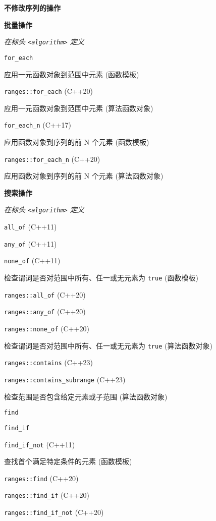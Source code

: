 \textbf{不修改序列的操作}

\noindent \textbf{批量操作} 

\textit{在标头 \lstinline{<algorithm>} 定义}

\noindent \lstinline{for_each}

应⽤⼀元函数对象到范围中元素 (函数模板)

\noindent \lstinline{ranges::for_each} (C++20) 

应⽤⼀元函数对象到范围中元素 (算法函数对象)

\noindent \lstinline{for_each_n} (C++17) 

应⽤函数对象到序列的前 N 个元素 (函数模板)

\noindent \lstinline{ranges::for_each_n} (C++20) 

应⽤函数对象到序列的前 N 个元素 (算法函数对象)

\noindent \textbf{搜索操作} 

\textit{在标头 \lstinline{<algorithm>} 定义}

\noindent \lstinline{all_of} (C++11)

\noindent \lstinline{any_of} (C++11)

\noindent \lstinline{none_of} (C++11)

检查谓词是否对范围中所有、任⼀或⽆元素为 \lstinline{true} (函数模板)

\noindent \lstinline{ranges::all_of} (C++20)

\noindent \lstinline{ranges::any_of} (C++20)

\noindent \lstinline{ranges::none_of} (C++20)

检查谓词是否对范围中所有、任⼀或⽆元素为 \lstinline{true} (算法函数对象)

\noindent \lstinline{ranges::contains} (C++23)

\noindent \lstinline{ranges::contains_subrange} (C++23)

检查范围是否包含给定元素或⼦范围 (算法函数对象)

\noindent \lstinline{find}

\noindent \lstinline{find_if}

\noindent \lstinline{find_if_not} (C++11)

查找⾸个满⾜特定条件的元素 (函数模板)

\noindent \lstinline{ranges::find} (C++20)

\noindent \lstinline{ranges::find_if} (C++20)

\noindent \lstinline{ranges::find_if_not} (C++20)

